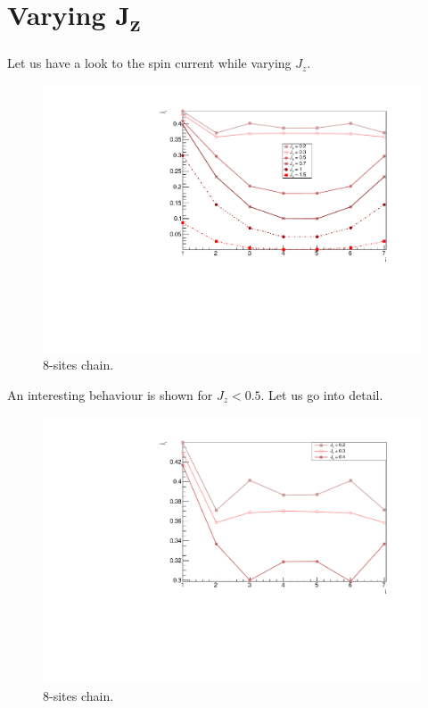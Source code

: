\section{Varying J\textsubscript{z}}

Let us have a look to the spin current while varying $J_z$.

\begin{figure}[H]
    \centering
    \includegraphics[scale=0.7]{Figures/8sites_spinCurrVSJz.pdf}
    \caption{8-sites chain.}
    \label{fig:my_label}
\end{figure}


An interesting behaviour is shown for $J_z < 0.5$. Let us go into detail.

\begin{figure}[H]
    \centering
    \includegraphics[scale=0.7]{Figures/8sites_spinCurrVsLOWJz.pdf}
    \caption{8-sites chain.}
    \label{fig:my_label}
\end{figure}

